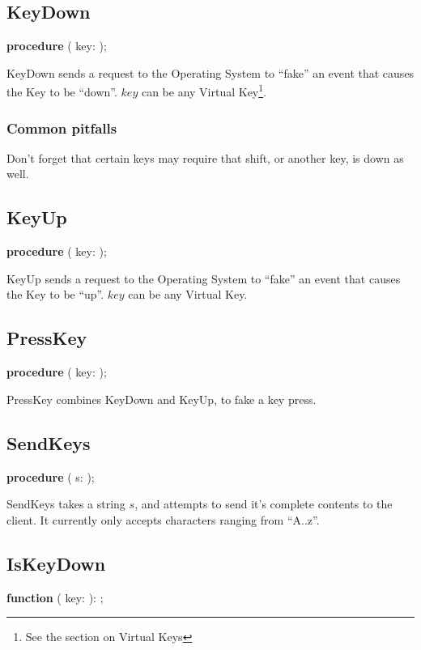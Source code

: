\documentclass[a4paper]{report}
\begin{document}
\subsection{KeyDown}

\textbf{procedure} {\color{blue}{KeyDown}}({\color{typeRed}
{key: }}{\color{typeGreen}{Word}});

KeyDown sends a request to the Operating System to ``fake'' an event that
causes the Key to be ``down''.
$key$ can be any Virtual Key\footnote{See the section on Virtual Keys}.

\subsubsection{Common pitfalls}

Don't forget that certain keys may require that shift, or another key,
is down as well.

\subsection{KeyUp}
\textbf{procedure} {\color{blue}{KeyUp}}({\color{typeRed}
{key: }}{\color{typeGreen}{Word}});

KeyUp sends a request to the Operating System to ``fake'' an event that
causes the Key to be ``up''.
$key$ can be any Virtual Key.

\subsection{PressKey}

\textbf{procedure} {\color{blue}{PressKey}}({\color{typeRed}
{key: }}{\color{typeGreen}{Word}});

PressKey combines KeyDown and KeyUp, to fake a key press.

\subsection{SendKeys}

\textbf{procedure} {\color{blue}{SendKEys}}({\color{typeRed}
{s: }}{\color{typeGreen}{String}});

SendKeys takes a string $s$, and attempts to send it's complete contents to
the client. It currently only accepts characters ranging from ``A..z''.

\subsection{IsKeyDown}
\textbf{function} {\color{blue}{PressKey}}({\color{typeRed}
{key: }}{\color{typeGreen}{Word}}): {\color{typeGreen}{Boolean}};
\end{document}
